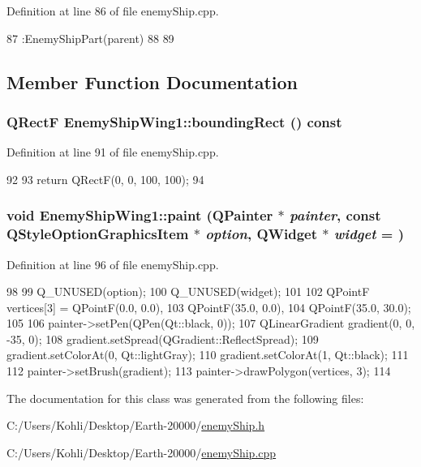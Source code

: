 Definition at line 86 of file enemyShip.cpp.


\begin{DoxyCode}
87         :EnemyShipPart(parent)
88 {
89 }
\end{DoxyCode}


\subsection{Member Function Documentation}
\hypertarget{class_enemy_ship_wing1_a54d9ca15a2b20458b7a272429ca946c9}{
\subsubsection[{boundingRect}]{\setlength{\rightskip}{0pt plus 5cm}QRectF EnemyShipWing1::boundingRect () const}}
\label{class_enemy_ship_wing1_a54d9ca15a2b20458b7a272429ca946c9}


Definition at line 91 of file enemyShip.cpp.


\begin{DoxyCode}
92 {
93     return QRectF(0, 0, 100, 100);
94 }
\end{DoxyCode}
\hypertarget{class_enemy_ship_wing1_a1082b635493db40141b28122c56327ea}{
\subsubsection[{paint}]{\setlength{\rightskip}{0pt plus 5cm}void EnemyShipWing1::paint (QPainter $\ast$ {\em painter}, \/  const QStyleOptionGraphicsItem $\ast$ {\em option}, \/  QWidget $\ast$ {\em widget} = {})}}
\label{class_enemy_ship_wing1_a1082b635493db40141b28122c56327ea}


Definition at line 96 of file enemyShip.cpp.


\begin{DoxyCode}
98 {
99     Q_UNUSED(option);
100     Q_UNUSED(widget);
101 
102     QPointF vertices[3] = {QPointF(0.0, 0.0),
103                                      QPointF(35.0, 0.0),
104                                      QPointF(35.0, 30.0)};
105 
106     painter->setPen(QPen(Qt::black, 0));
107     QLinearGradient gradient(0, 0, -35, 0);
108     gradient.setSpread(QGradient::ReflectSpread);
109     gradient.setColorAt(0, Qt::lightGray);
110     gradient.setColorAt(1, Qt::black);
111 
112     painter->setBrush(gradient);
113     painter->drawPolygon(vertices, 3);
114 }
\end{DoxyCode}


The documentation for this class was generated from the following files:\begin{DoxyCompactItemize}
\item 
C:/Users/Kohli/Desktop/Earth-\/20000/\hyperlink{enemy_ship_8h}{enemyShip.h}\item 
C:/Users/Kohli/Desktop/Earth-\/20000/\hyperlink{enemy_ship_8cpp}{enemyShip.cpp}\end{DoxyCompactItemize}
